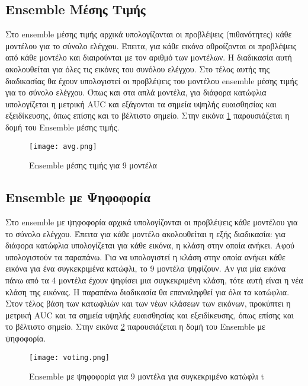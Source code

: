 \subsection{Ensemble Μέσης Τιμής}
\label{subsec:5.3.1}
Στο ensemble μέσης τιμής αρχικά υπολογίζονται οι προβλέψεις (πιθανότητες) κάθε μοντέλου για το σύνολο ελέγχου. Έπειτα, για κάθε εικόνα αθροίζονται οι προβλέψεις από κάθε μοντέλο και διαιρούνται με τον αριθμό των μοντέλων. Η διαδικασία αυτή ακολουθείται για όλες τις εικόνες του συνόλου ελέγχου. Στο τέλος αυτής της διαδικασίας θα έχουν υπολογιστεί οι προβλέψεις του μοντέλου ensemble μέσης τιμής για το σύνολο ελέγχου. Όπως και στα απλά μοντέλα, για διάφορα κατώφλια υπολογίζεται η μετρική AUC και εξάγονται τα σημεία υψηλής ευαισθησίας και εξειδίκευσης, όπως επίσης και το βέλτιστο σημείο.  Στην εικόνα \ref{figure:avg} παρουσιάζεται η δομή του Ensemble μέσης τιμής.


\begin{figure}[!h]
    \centering
      \texttt{[image: avg.png]} \caption{Ensemble μέσης τιμής για 9 μοντέλα}
      \label{figure:avg}    
  \end{figure}
 
\subsection{Ensemble με Ψηφοφορία}
\label{subsec:5.3.2}
Στο ensemble με ψηφοφορία αρχικά υπολογίζονται οι προβλέψεις κάθε μοντέλου για το σύνολο ελέγχου. 
Έπειτα για κάθε μοντέλο ακολουθείται η εξής διαδικασία: για διάφορα κατώφλια υπολογίζεται για κάθε εικόνα, η κλάση στην οποία ανήκει. Αφού υπολογιστούν τα παραπάνω. Για να υπολογιστεί η κλάση στην οποία ανήκει κάθε εικόνα για ένα συγκεκριμένα κατώφλι, το 9 μοντέλα ψηφίζουν. Αν για μία εικόνα πάνω από τα 4 μοντέλα έχουν ψηφίσει μια συγκεκριμένη κλάση, τότε αυτή είναι η νέα κλάση της εικόνας. Η παραπάνω διαδικασία θα επαναληφθεί για όλα τα κατώφλια. Στον τέλος βάση των κατωφλιών και των νέων κλάσεων των εικόνων, προκύπτει η μετρική AUC και τα σημεία υψηλής ευαισθησίας και εξειδίκευσης, όπως επίσης και το βέλτιστο σημείο. Στην εικόνα \ref{figure:voting} παρουσιάζεται η δομή του Ensemble με ψηφοφορία.

\begin{figure}[!h]
    \centering
      \texttt{[image: voting.png]} \caption{Ensemble με ψηφοφορία για 9 μοντέλα για συγκεκριμένο κατώφλι t}
      \label{figure:voting}    
\end{figure}
  
